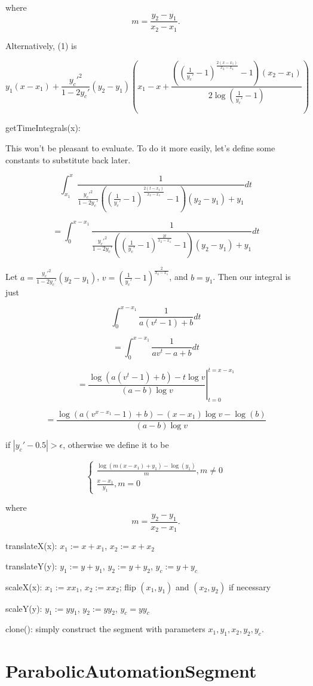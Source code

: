 \documentclass{article}
\begin{document}
{where $$m=\frac{y_2-y_1}{x_2-x_1}.$$

Alternatively, (1) is 

$$\boxed{y_1(x-x_1)+\frac{y_c'^2}{1-2y_c'} (y_2-y_1)\left(x_1 - x + \frac{\left(\left(\frac{1}{y_c'}-1\right)^\frac{2(x-x_1)}{x_2-x_1}-1\right)(x_2-x_1)}{2\log\left(\frac{1}{y_c'}-1\right)}\right)}$$

getTimeIntegrals(x):

This won't be pleasant to evaluate. To do it more easily, let's define some constants to substitute back later.

$$\int_{x_1}^{x}\frac{1}{\frac{y_c'^2}{1-2y_c'}\left(\left(\frac{1}{y_c'}-1\right)^{\frac{2(t-x_1)}{x_2-x_1}}-1\right)(y_2-y_1)+y_1} dt$$

$$=\int_{0}^{x-x_1}\frac{1}{\frac{y_c'^2}{1-2y_c'}\left(\left(\frac{1}{y_c'}-1\right)^{\frac{2t}{x_2-x_1}}-1\right)(y_2-y_1)+y_1} dt$$

Let $a = \frac{y_c'^2}{1-2y_c'}(y_2-y_1)$, $v=\left(\frac{1}{y_c'}-1\right)^\frac{2}{x_2-x_1}$, and $b=y_1$. Then our integral is just

$$\int_{0}^{x-x_1}\frac{1}{a(v^t-1)+b} dt$$

$$=\int_{0}^{x-x_1}\frac{1}{av^t-a+b} dt$$

$$=\left. \frac{\log(a(v^t-1)+b)-t\log v}{(a-b)\log v} \right\vert ^ {t=x-x_1}_{t=0}$$

$$=\boxed{\frac{\log(a(v^{x-x_1}-1)+b)-(x-x_1)\log v - \log(b)}{(a-b)\log v}}$$

if $|y_c'-0.5| > \epsilon$, otherwise we define it to be

$$\begin{cases}
\frac{\log(m(x-x_1)+y_1)-\log(y_1)}{m}, m\neq 0 \\
\frac{x-x_1}{y_1}, m = 0
\end{cases}$$

where $$m=\frac{y_2-y_1}{x_2-x_1}.$$

translateX(x): $x_1:=x+x_1$, $x_2:=x+x_2$

translateY(y): $y_1:=y+y_1$, $y_2:=y+y_2$, $y_c:=y+y_c$

scaleX(x): $x_1:=xx_1$, $x_2:=xx_2$; flip $(x_1, y_1)$ and $(x_2, y_2)$ if necessary

scaleY(y): $y_1:=yy_1$, $y_2:=yy_2$, $y_c=yy_c$

clone(): simply construct the segment with parameters $x_1, y_1, x_2, y_2, y_c$.

\section{ParabolicAutomationSegment}

}
\end{document}
